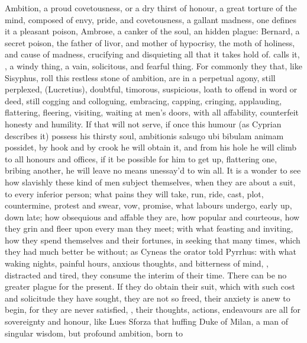 {Ambition, a proud covetousness, or a dry thirst of honour, a great
torture of the mind, composed of envy, pride, and covetousness, a
gallant madness, one defines it a pleasant poison, Ambrose, a
canker of the soul, an hidden plague: Bernard, a secret poison,
the father of livor, and mother of hypocrisy, the moth of holiness, and
cause of madness, crucifying and disquieting all that it takes hold of.
\Seneca calls it, , a windy
thing, a vain, solicitous, and fearful thing. For commonly they that,
like Sisyphus, roll this restless stone of ambition, are in a perpetual
agony, still perplexed, 
(Lucretius), doubtful, timorous, suspicious, loath to offend in word or
deed, still cogging and colloguing, embracing, capping, cringing,
applauding, flattering, fleering, visiting, waiting at men's doors,
with all affability, counterfeit honesty and humility. If that
will not serve, if once this humour (as Cyprian describes it)
possess his thirsty soul, ambitionis salsugo ubi bibulam animam
possidet, by hook and by crook he will obtain it, and from his hole he
will climb to all honours and offices, if it be possible for him to get
up, flattering one, bribing another, he will leave no means unessay'd
to win all. It is a wonder to see how slavishly these kind of men
subject themselves, when they are about a suit, to every inferior
person; what pains they will take, run, ride, cast, plot, countermine,
protest and swear, vow, promise, what labours undergo, early up, down
late; how obsequious and affable they are, how popular and courteous,
how they grin and fleer upon every man they meet; with what feasting
and inviting, how they spend themselves and their fortunes, in seeking
that many times, which they had much better be without; as Cyneas
the orator told Pyrrhus: with what waking nights, painful hours,
anxious thoughts, and bitterness of mind, ,
distracted and tired, they consume the interim of their time. There can
be no greater plague for the present. If they do obtain their suit,
which with such cost and solicitude they have sought, they are not so
freed, their anxiety is anew to begin, for they are never satisfied,
, their thoughts, actions, endeavours
are all for sovereignty and honour, like Lues Sforza that huffing
Duke of Milan, a man of singular wisdom, but profound ambition, born to
}
